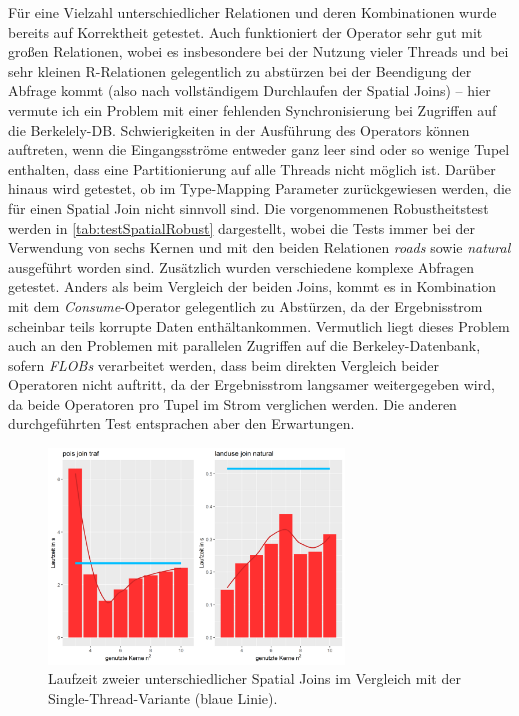 \documentclass[a4paper,12pt,twoside]{article}
\newcommand{\Fb}[1]{\textit{#1}} %
\begin{document}
{Für eine Vielzahl unterschiedlicher Relationen und deren Kombinationen wurde bereits auf Korrektheit getestet. Auch funktioniert der Operator sehr gut mit großen Relationen, wobei es insbesondere bei der Nutzung vieler Threads und bei sehr kleinen R-Relationen gelegentlich zu abstürzen bei der Beendigung der Abfrage kommt (also nach vollständigem Durchlaufen der Spatial Joins) -- hier vermute ich ein Problem mit einer fehlenden Synchronisierung bei Zugriffen auf die Berkelely-DB. Schwierigkeiten in der Ausführung des Operators können auftreten, wenn die Eingangsströme entweder ganz leer sind oder so wenige Tupel enthalten, dass eine Partitionierung auf alle Threads nicht möglich ist. Darüber hinaus wird getestet, ob im Type-Mapping Parameter zurückgewiesen werden, die für einen Spatial Join nicht sinnvoll sind. Die vorgenommenen Robustheitstest werden in \autoref{tab:testSpatialRobust} dargestellt, wobei die Tests immer bei der Verwendung von sechs Kernen und mit den beiden Relationen \Fb{roads} sowie \Fb{natural} ausgeführt worden sind. Zusätzlich wurden verschiedene komplexe Abfragen getestet. Anders als beim Vergleich der beiden Joins, kommt es in Kombination mit dem \Fb{Consume}-Operator gelegentlich zu Abstürzen, da der Ergebnisstrom scheinbar teils korrupte Daten enthältankommen. Vermutlich liegt dieses Problem auch an den Problemen mit parallelen Zugriffen auf die Berkeley-Datenbank, sofern \Fb{FLOBs} verarbeitet werden, dass beim direkten Vergleich beider Operatoren nicht auftritt, da der Ergebnisstrom langsamer weitergegeben wird, da beide Operatoren pro Tupel im Strom verglichen werden. Die anderen durchgeführten Test entsprachen aber den Erwartungen.

\begin{figure}
	\centering
	\includegraphics[width=0.70\textwidth]{Bilder/sj_kerne.png}
	\caption{Laufzeit zweier unterschiedlicher Spatial Joins im Vergleich mit der Single-Thread-Variante (blaue Linie).}
	\label{img:sjKern}
\end{figure}

}
\end{document}
